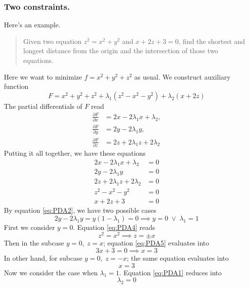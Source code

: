 \documentclass[../../Main.tex]{subfiles}
\begin{document}
\subsubsection*{Two constraints.} Here's an example.
\begin{quotation}
    Given two equation $z^2=x^2+y^2$ and $x+2z+3=0$, find the shortest and longest distance from the origin and the intersection of those two equations.
\end{quotation}
Here we want to minimize $f=x^2+y^2+z^2$ as usual. We construct auxiliary function
\begin{equation*}
    F=x^2+y^2+z^2+\lambda_1(z^2-x^2-y^2)+\lambda_2(x+2z)
\end{equation*}
The partial differentials of $F$ read
\begin{align*}
    \frac{\partial F}{\partial x}&=2x-2\lambda_1x+\lambda_2,\\
    \frac{\partial F}{\partial y}&=2y-2\lambda_1y,\\
    \frac{\partial F}{\partial z}&=2z+2\lambda_1z+2\lambda_2
\end{align*}
Putting it all together, we have these equations
\begin{align}
    2x-2\lambda_1x+\lambda_2&=0\label{eq:PDA1}\\
    2y-2\lambda_1y&=0\label{eq:PDA2}\\
    2z+2\lambda_1z+2\lambda_2&=0\label{eq:PDA3}\\
    z^2-x^2-y^2&=0\label{eq:PDA4}\\
    x+2z+3&=0\label{eq:PDA5}
\end{align}
By equation \ref{eq:PDA2}, we have two possible cases
\begin{equation*}
    2y-2\lambda_1y=y(1-\lambda_1)=0\implies y=0\;\lor\;\lambda_1=1
\end{equation*}
First we consider $y=0$. Equation \ref{eq:PDA4} reads
\begin{equation*}
    z^2=x^2\implies z=\pm x
\end{equation*}
Then in the subcase $y=0,\;z=x$; equation \ref{eq:PDA5} evaluates into
\begin{equation*}
    3x+3=0\implies x=3
\end{equation*}
In other hand, for subcase $y=0,\;z=-x$; the same equation evaluates into
\begin{equation*}
    x=3
\end{equation*}
Now we consider the case when $\lambda_1=1$. Equation \ref{eq:PDA1} reduces into 
\begin{equation*}
    \lambda_2=0
\end{equation*}
\end{document}
